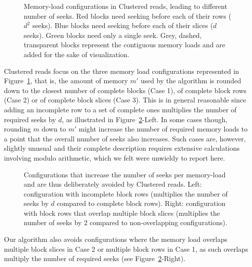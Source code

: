 \documentclass[10pt, conference, compsocconf]{IEEEtran}
\begin{document}
\begin{figure}
\centering
\def\svgwidth{0.3\columnwidth}

\def\svgwidth{0.3\columnwidth}

\def\svgwidth{0.3\columnwidth}

\caption{Memory-load configurations in Clustered reads, leading to
  different number of seeks. Red blocks need seeking before each of
  their rows ($d^2$ seeks). Blue blocks need seeking before each of
  their slices ($d$ seeks). Green blocks need only a single
  seek. Grey, dashed, transparent blocks represent the contiguous
  memory loads and are added for the sake of visualization.}
\label{fig:cluster-reads}
\end{figure}
Clustered reads focus on the three memory load
configurations represented in Figure~\ref{fig:cluster-reads}, that is,
the amount of memory $m'$ used by the algorithm is rounded down to the
closest number of complete blocks (Case 1), of complete block rows (Case
2) or of complete block slices (Case 3). This is in general reasonable
since adding an incomplete row to a set of complete ones multiplies
the number of required seeks by $d$, as illustrated in
Figure~\ref{fig:avoided-configurations}-Left. In some cases though,
rounding $m$ down to $m'$ might increase the number of required
memory loads to a point that the overall number of seeks also
increases. Such cases are, however, slightly unusual and their
complete description requires extensive calculations involving modulo
arithmetic, which we felt were unwieldy to report here.
\begin{figure}
  \centering
\def\svgwidth{0.3\columnwidth}

\quad \quad \quad
\def\svgwidth{0.3\columnwidth}

\caption{Configurations that increase the number of seeks per
  memory-load and are thus deliberately avoided by Clustered
  reads. Left: configuration with incomplete block rows (multiplies
  the number of seeks by $d$ compared to complete block rows). Right:
  configuration with block rows that overlap multiple block slices
  (multiplies the number of seeks by $2$ compared to non-overlapping
  configurations).}
\label{fig:avoided-configurations}
\end{figure}

Our algorithm also avoids configurations where the memory load
overlaps multiple block slices in Case 2 or multiple block rows in
Case 1, as such overlaps multiply the number of required seeks (see
Figure~\ref{fig:avoided-configurations}-Right).
\end{document}
